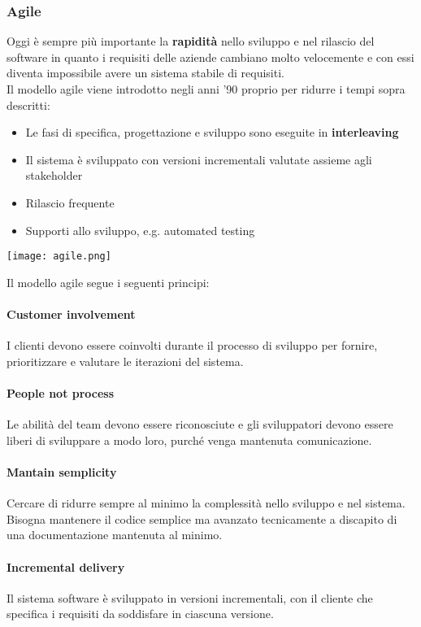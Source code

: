 \subsubsection{Agile}
Oggi è sempre più importante la \textbf{rapidità} nello sviluppo e nel rilascio del software in quanto i requisiti delle aziende cambiano molto velocemente e con essi diventa impossibile avere un sistema stabile di requisiti.\\
Il modello agile viene introdotto negli anni '90 proprio per ridurre i tempi sopra descritti:
\begin{itemize}
	\item Le fasi di specifica, progettazione e sviluppo sono eseguite in \textbf{interleaving}
	\item Il sistema è sviluppato con versioni incrementali valutate assieme agli stakeholder
	\item Rilascio frequente
	\item Supporti allo sviluppo, e.g. automated testing
\end{itemize}
\begin{center}
	\texttt{[image: agile.png]}
\end{center}

Il modello agile segue i seguenti principi:
\paragraph{Customer involvement} I clienti devono essere coinvolti durante il processo di sviluppo per fornire, prioritizzare e valutare le iterazioni del sistema.
\paragraph{People not process} Le abilità del team devono essere riconosciute e gli sviluppatori devono essere liberi di sviluppare a modo loro, purché venga mantenuta comunicazione.
\paragraph{Mantain semplicity} Cercare di ridurre sempre al minimo la complessità nello sviluppo e nel sistema. Bisogna mantenere il codice semplice ma avanzato tecnicamente a discapito di una documentazione mantenuta al minimo.
\paragraph{Incremental delivery} Il sistema software è sviluppato in versioni incrementali, con il cliente che specifica i requisiti da soddisfare in ciascuna versione.
